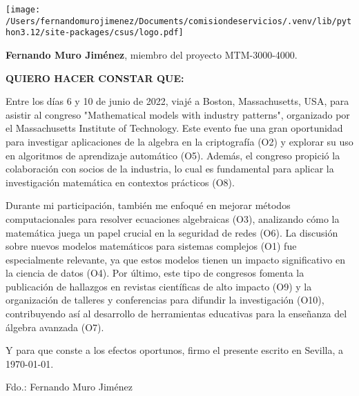\documentclass{memoir}
\begin{document}
\texttt{[image:  /Users/fernandomurojimenez/Documents/comisiondeservicios/.venv/lib/python3.12/site-packages/csus/logo.pdf]}
\begin{vplace}[.5]
\vspace{1cm}
\textbf{Fernando Muro Jiménez}, miembro del proyecto MTM-3000-4000.

\vspace{1cm}

\textbf{QUIERO HACER CONSTAR QUE:}

\vspace{1cm}

Entre los días 6 y 10 de junio de 2022, viajé a Boston, Massachusetts, USA, para asistir al congreso "Mathematical models with industry patterns", organizado por el Massachusetts Institute of Technology. Este evento fue una gran oportunidad para investigar aplicaciones de la algebra en la criptografía (O2) y explorar su uso en algoritmos de aprendizaje automático (O5). Además, el congreso propició la colaboración con socios de la industria, lo cual es fundamental para aplicar la investigación matemática en contextos prácticos (O8).

Durante mi participación, también me enfoqué en mejorar métodos computacionales para resolver ecuaciones algebraicas (O3), analizando cómo la matemática juega un papel crucial en la seguridad de redes (O6). La discusión sobre nuevos modelos matemáticos para sistemas complejos (O1) fue especialmente relevante, ya que estos modelos tienen un impacto significativo en la ciencia de datos (O4). Por último, este tipo de congresos fomenta la publicación de hallazgos en revistas científicas de alto impacto (O9) y la organización de talleres y conferencias para difundir la investigación (O10), contribuyendo así al desarrollo de herramientas educativas para la enseñanza del álgebra avanzada (O7). 

\vspace{1cm}

Y para que conste a los efectos oportunos, firmo el presente escrito en Sevilla, a \today.

\vspace{3cm}

\begin{flushright}
    Fdo.: Fernando Muro Jiménez 
\end{flushright}
\end{vplace}
\end{document}
